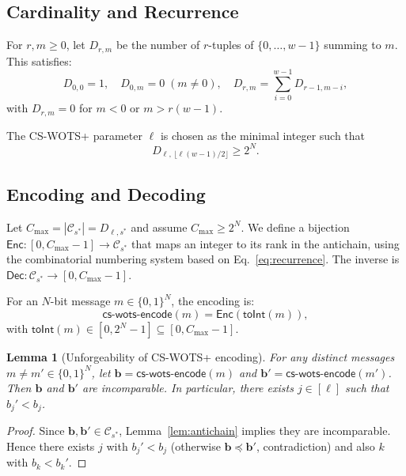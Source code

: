 \documentclass[11pt,a4paper]{article}
\newtheorem{lemma}[theorem]{Lemma}
\newcommand{\bits}{\{0,1\}}
\newcommand{\cC}{\mathcal{C}}
\newcommand{\Enc}{\mathsf{Enc}}
\newcommand{\Dec}{\mathsf{Dec}}
\newcommand{\Nbits}{N}
\begin{document}
\subsection{Cardinality and Recurrence}

For $r,m \ge 0$, let $D_{r,m}$ be the number of $r$-tuples of $\{0,\ldots,w-1\}$ summing to $m$. This satisfies:
\begin{equation}\label{eq:recurrence}
D_{0,0} = 1, \quad D_{0,m} = 0 \;(m \neq 0), \quad D_{r,m} = \sum_{i=0}^{w-1} D_{r-1,m-i},
\end{equation}
with $D_{r,m} = 0$ for $m < 0$ or $m > r(w-1)$.

The CS-WOTS+ parameter $\ell$ is chosen as the minimal integer such that
\begin{equation}\label{eq:ell-def}
D_{\ell,\, \lfloor \ell(w-1)/2\rfloor} \ge 2^\Nbits.
\end{equation}

\subsection{Encoding and Decoding}

Let $C_{\max} = |\cC_{s^*}| = D_{\ell, s^*}$ and assume $C_{\max} \ge 2^\Nbits$. We define a bijection $\Enc : [0, C_{\max}-1] \to \cC_{s^*}$ that maps an integer to its rank in the antichain, using the combinatorial numbering system based on Eq.~\eqref{eq:recurrence}. The inverse is $\Dec : \cC_{s^*} \to [0, C_{\max}-1]$.

For an $\Nbits$-bit message $m \in \bits^\Nbits$, the encoding is:
\[
\mathsf{cs\text{-}wots\text{-}encode}(m) = \Enc(\mathsf{toInt}(m)),
\]
with $\mathsf{toInt}(m) \in [0, 2^\Nbits-1] \subseteq [0, C_{\max}-1]$.

\begin{lemma}[Unforgeability of CS-WOTS+ encoding]
\label{lem:cs-wots-uf}
For any distinct messages $m \neq m' \in \bits^\Nbits$, let $\mathbf{b} = \mathsf{cs\text{-}wots\text{-}encode}(m)$ and $\mathbf{b}' = \mathsf{cs\text{-}wots\text{-}encode}(m')$. Then $\mathbf{b}$ and $\mathbf{b}'$ are incomparable. In particular, there exists $j \in [\ell]$ such that $b_j' < b_j$.
\end{lemma}

\begin{proof}
Since $\mathbf{b}, \mathbf{b}' \in \cC_{s^*}$, Lemma~\ref{lem:antichain} implies they are incomparable. Hence there exists $j$ with $b_j' < b_j$ (otherwise $\mathbf{b} \preceq \mathbf{b}'$, contradiction) and also $k$ with $b_k < b_k'$.
\end{proof}
\end{document}
